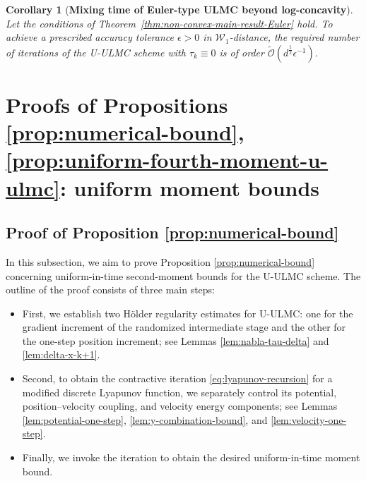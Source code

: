 \documentclass[12pt]{article}
\newenvironment{redtext}
  {\color{black}\ignorespaces}
  {\ignorespacesafterend}
\numberwithin{equation}{section}
\newtheorem{cor}{Corollary}[section]
\begin{document}
\begin{redtext}
\begin{cor}[\textbf{Mixing time of Euler-type ULMC beyond log-concavity}]
\label{cor:mixing-time-non-convex-Euler}
Let the conditions of
Theorem~\ref{thm:non-convex-main-result-Euler} hold.
To achieve a prescribed accuracy tolerance
$\epsilon>0$ in $\mathcal W_1$-distance, the required number of
iterations of the U-ULMC scheme with $\tau_k\equiv0$
is of order
\(
\widetilde{\mathcal O}
(
d^{\frac12}\epsilon^{-1}
)
\).
\end{cor}



\end{redtext}









\section{Proofs of Propositions \ref{prop:numerical-bound}, \ref{prop:uniform-fourth-moment-u-ulmc}: uniform moment bounds}
\label{sec:pf-scheme-bound}
\subsection{Proof of Proposition \ref{prop:numerical-bound}}
\label{sec:pf-scheme-2-nd-bound}


In this subsection, we aim to prove Proposition \ref{prop:numerical-bound} 
concerning uniform-in-time second-moment bounds for the U-ULMC scheme. 
The outline of the proof consists of three main steps:
\begin{itemize}
    \item First, we establish two H\"older regularity estimates for U-ULMC: one for the gradient increment of the randomized intermediate stage and the other for the one-step position increment; see Lemmas \ref{lem:nabla-tau-delta} and \ref{lem:delta-x-k+1}.
    \item Second, to obtain the contractive iteration \eqref{eq:lyapunov-recursion} for a modified discrete Lyapunov function, we separately control its potential, position--velocity coupling, and velocity energy components; see Lemmas \ref{lem:potential-one-step}, \ref{lem:y-combination-bound}, and \ref{lem:velocity-one-step}.
    \item Finally, we invoke the iteration to obtain the desired uniform-in-time moment bound. 
\end{itemize}
\end{document}
